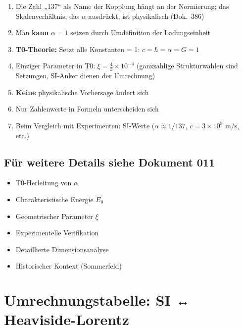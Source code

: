 	\begin{enumerate}
		\item Die Zahl „137“ als Name der Kopplung hängt an der Normierung; das Skalenverhältnis, das $\alpha$ ausdrückt, ist physikalisch (Dok.~386)
		
		\item Man \textbf{kann} $\alpha = 1$ setzen durch Umdefinition der Ladungseinheit
		
		\item \textbf{T0-Theorie:} Setzt alle Konstanten = 1: $c = \hbar = \alpha = G = 1$
		
		\item Einziger Parameter in T0: $\xi = \frac{4}{3} \times 10^{-4}$ (ganzzahlige Strukturwahlen sind Setzungen, SI-Anker dienen der Umrechnung)
		
		\item \textbf{Keine} physikalische Vorhersage ändert sich
		
		\item Nur Zahlenwerte in Formeln unterscheiden sich
		
		\item Beim Vergleich mit Experimenten: SI-Werte ($\alpha \approx 1/137$, $c = 3 \times 10^8$ m/s, etc.)
	\end{enumerate}
	
	\subsection{Für weitere Details siehe Dokument 011}
	
	\begin{itemize}
		\item T0-Herleitung von $\alpha$
		\item Charakteristische Energie $E_0$
		\item Geometrischer Parameter $\xi$
		\item Experimentelle Verifikation
		\item Detaillierte Dimensionsanalyse
		\item Historischer Kontext (Sommerfeld)
	\end{itemize}
	
	\appendix
	
	\section{Umrechnungstabelle: SI ↔ Heaviside-Lorentz}
	
